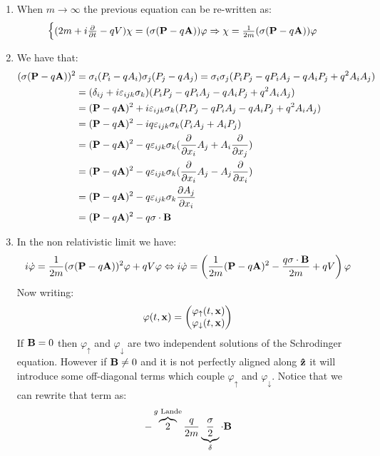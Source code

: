 \documentclass[10pt,a4paper]{book}
\begin{document}
\begin{enumerate}
\item When $m \to \infty$ the previous equation can be re-written as:
\[
\begin{cases}
(2m + i \pdv{}{t} - qV) \chi = (\vb{\sigma} (\vb{P} - q \vb{A})) \varphi \Rightarrow \chi = \frac{1}{2m} (\vb{\sigma}(\vb{P} - q \vb{A})) \varphi
\end{cases}
\]

\item We have that:
\begin{align*}
(\vb{\sigma}(\vb{P} - q \vb{A}))^2 &= \sigma_i(P_i - q A_i) \sigma_j (P_j - q A_j) = \sigma_i \sigma_j (P_i P_j - q P_i A_j - q A_i P_j + q^2 A_i A_j)\\
&= (\delta_{ij} + i \varepsilon_{ijk}\sigma_k)(P_i P_j - q P_i A_j - q A_i P_j + q^2 A_i A_j)\\
&= (\vb{P} - q \vb{A})^2 + i \varepsilon_{ijk} \sigma_k (P_i P_j - q P_i A_j - q A_i P_j + q^2 A_i A_j)\\
&= (\vb{P} - q\vb{A})^2 - i q \varepsilon_{ijk} \sigma_k (P_i A_j + A_i P_j)\\
&= (\vb{P} - q\vb{A})^2 - q \varepsilon_{ijk} \sigma_k (\pdv{}{x_i} A_j + A_i \pdv{x_j})\\
&= (\vb{P} - q\vb{A})^2 - q \varepsilon_{ijk} \sigma_k (\pdv{}{x_i} A_j - A_j \pdv{x_i})\\
&= (\vb{P} - q\vb{A})^2 - q \varepsilon_{ijk} \sigma_k \pdv{A_j}{x_i} \\
&= (\vb{P} - q\vb{A})^2 - q \vb{\sigma} \cdot \vb{B}
\end{align*}

\item In the non relativistic limit we have:
\[
i \dot{\varphi} = \frac{1}{2m} (\vb{\sigma}(\vb{P} - q \vb{A}))^2 \varphi + q V \varphi \Leftrightarrow i \dot{\varphi} = \left(\frac{1}{2m} (\vb{P} - q \vb{A})^2 - \frac{q \vb{\sigma} \cdot \vb{B}}{2m}  + q V \right) \varphi
\]
Now writing:
\[
\varphi(t, \vb{x}) = \begin{pmatrix}
\varphi_{\uparrow} (t, \vb{x})\\
\varphi_{\downarrow} (t, \vb{x}) 
\end{pmatrix}
\]
If $\vb{B} = 0$ then $\varphi_\uparrow$ and $\varphi_\downarrow$ are two independent solutions of the Schrodinger equation. However if $\vb{B} \neq 0$ and it is not perfectly aligned along $\vu{z}$ it will introduce some off-diagonal terms which couple $\varphi_\uparrow$ and $\varphi_\downarrow$. Notice that we can rewrite that term as:
\[
-\overbrace{2}^{g \text{~Lande}} \frac{q}{2m} \underbrace{\frac{\vb{\sigma}}{2}}_{\vb{\delta}} \cdot \vb{B}
\]

\end{enumerate}
\end{document}
